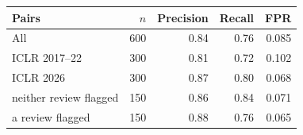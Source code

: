 \begin{tabular}{lrrrr}
\toprule
Pairs & $n$ & Precision & Recall & FPR \\
\midrule
All & 600 & 0.84 & 0.76 & 0.085 \\
ICLR 2017--22 & 300 & 0.81 & 0.72 & 0.102 \\
ICLR 2026 & 300 & 0.87 & 0.80 & 0.068 \\
\quad neither review flagged & 150 & 0.86 & 0.84 & 0.071 \\
\quad a review flagged & 150 & 0.88 & 0.76 & 0.065 \\
\bottomrule
\end{tabular}

